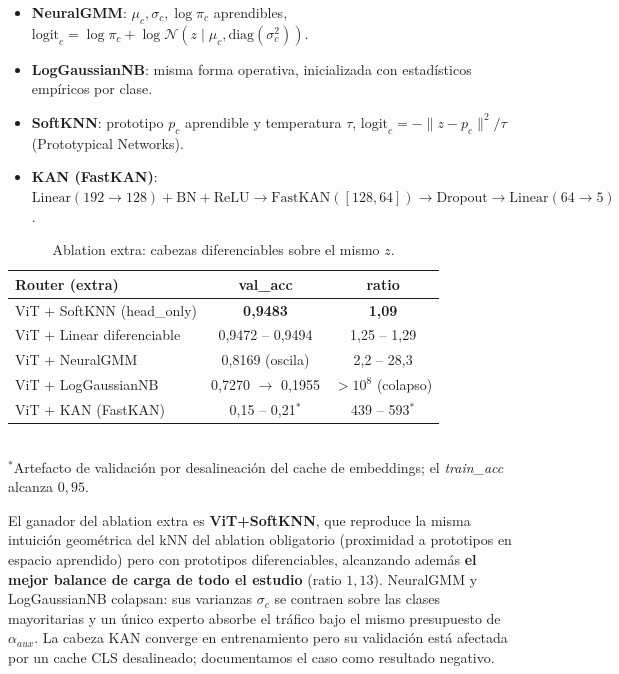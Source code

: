 \documentclass[conference]{IEEEtran}
\begin{document}
\begin{itemize}
    \item \textbf{NeuralGMM}: $\mu_c, \sigma_c, \log\pi_c$ aprendibles, $\text{logit}_c = \log\pi_c + \log\mathcal{N}(z\mid\mu_c, \mathrm{diag}(\sigma_c^2))$.
    \item \textbf{LogGaussianNB}: misma forma operativa, inicializada con estadísticos empíricos por clase.
    \item \textbf{SoftKNN}: prototipo $p_c$ aprendible y temperatura $\tau$, $\text{logit}_c = -\|z-p_c\|^2/\tau$ (Prototypical Networks).
    \item \textbf{KAN (FastKAN)}: $\text{Linear}(192{\to}128){+}\text{BN}{+}\text{ReLU}\to\text{FastKAN}([128,64])\to\text{Dropout}\to\text{Linear}(64{\to}5)$.
\end{itemize}

\begin{table}[H]
\centering
\caption{Ablation extra: cabezas diferenciables sobre el mismo $z$.}
\label{tab:ablation_extra}
\begin{tabular}{@{}lcc@{}}
\toprule
\textbf{Router (extra)} & \textbf{val\_acc} & \textbf{ratio} \\ \midrule
ViT + SoftKNN (head\_only)            & \textbf{0{,}9483} & \textbf{1{,}09} \\
ViT + Linear diferenciable            & 0{,}9472 -- 0{,}9494 & 1{,}25 -- 1{,}29 \\
ViT + NeuralGMM                       & 0{,}8169 (oscila)   & 2{,}2 -- 28{,}3 \\
ViT + LogGaussianNB                   & 0{,}7270 $\to$ 0{,}1955 & $> 10^{8}$ (colapso) \\
ViT + KAN (FastKAN)                   & 0{,}15 -- 0{,}21$^{*}$ & 439 -- 593$^{*}$ \\ \bottomrule
\end{tabular}\\[2pt]
{\footnotesize $^{*}$Artefacto de validación por desalineación del cache de embeddings; el \textit{train\_acc} alcanza $0{,}95$.}
\end{table}

El ganador del ablation extra es \textbf{ViT+SoftKNN}, que reproduce la misma intuición geométrica del k\textendash NN del ablation obligatorio (proximidad a prototipos en espacio aprendido) pero con prototipos diferenciables, alcanzando además \textbf{el mejor balance de carga de todo el estudio} (ratio $1{,}13$). NeuralGMM y LogGaussianNB colapsan: sus varianzas $\sigma_c$ se contraen sobre las clases mayoritarias y un único experto absorbe el tráfico bajo el mismo presupuesto de $\alpha_{aux}$. La cabeza KAN converge en entrenamiento pero su validación está afectada por un cache CLS desalineado; documentamos el caso como resultado negativo.
\end{document}
